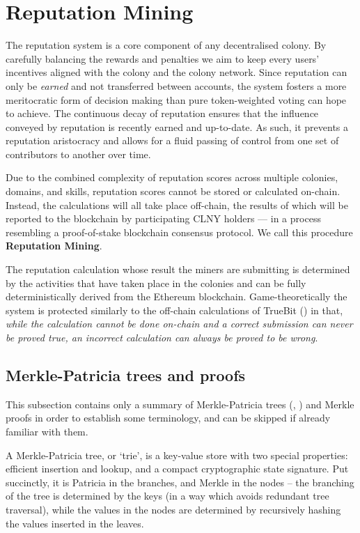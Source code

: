 \section{Reputation Mining}\label{sec:reputationmining}

The reputation system is a core component of any decentralised colony. By carefully balancing the rewards and penalties we aim to keep every users' incentives aligned with the colony and the colony network. Since reputation can only be \emph{earned} and not transferred between accounts, the system fosters a more meritocratic form of decision making than pure token-weighted voting can hope to achieve. The continuous decay of reputation ensures that the influence conveyed by reputation is recently earned and up-to-date. As such, it prevents a reputation aristocracy and allows for a fluid passing of control from one set of contributors to another over time.


Due to the combined complexity of reputation scores across multiple colonies, domains, and skills, reputation scores cannot be stored or calculated on-chain. Instead, the calculations will all take place off-chain, the results of which will be reported to the blockchain by participating CLNY holders --- in a process resembling a proof-of-stake blockchain consensus protocol. We call this procedure \textbf{Reputation Mining}.

The reputation calculation whose result the miners are submitting is determined by the activities that have taken place in the colonies and can be fully deterministically derived from the Ethereum blockchain. Game-theoretically the system is protected similarly to the off-chain calculations of TrueBit (\cite{TruebitWhitepaper}) in that, \emph{while the calculation cannot be done on-chain and a correct submission can never be proved true, an incorrect calculation can always be proved to be wrong}.


\subsection{Merkle-Patricia trees and proofs}\label{sec:Merkle-summary}
This subsection contains only a summary of Merkle-Patricia trees (\cite{MerkleTrees}, \cite{MerkleInEthereum}) and Merkle proofs in order to establish some terminology, and can be skipped if already familiar with them.

A Merkle-Patricia tree, or `trie', is a key-value store with two special properties: efficient insertion and lookup, and a compact cryptographic state signature. Put succinctly, it is Patricia in the branches, and Merkle in the nodes -- the branching of the tree is determined by the keys (in a way which avoids redundant tree traversal), while the values in the nodes are determined by recursively hashing the values inserted in the leaves.

